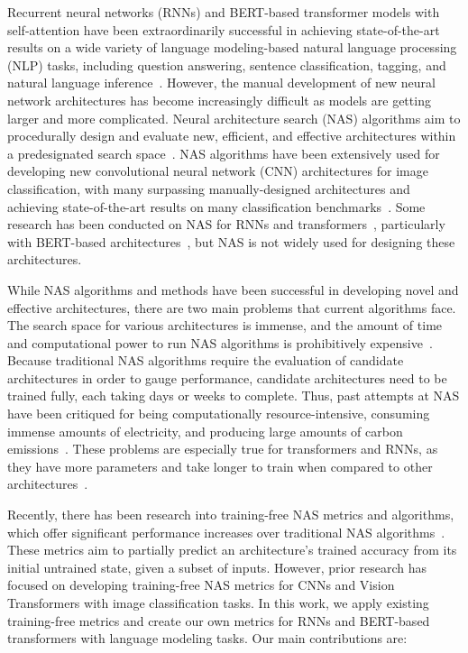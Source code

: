 \documentclass[11pt]{article}
\begin{document}
Recurrent neural networks (RNNs) and BERT-based transformer models with self-attention have been extraordinarily successful in achieving state-of-the-art results on a wide variety of language modeling-based natural language processing (NLP) tasks, including question answering, sentence classification, tagging, and natural language inference~\cite{brown_language_2020, palangi_deep_2016, raffel_exploring_2020, sundermeyer_lstm_2012, yu_review_2019}. However, the manual development of new neural network architectures has become increasingly difficult as models are getting larger and more complicated. Neural architecture search (NAS) algorithms aim to procedurally design and evaluate new, efficient, and effective architectures within a predesignated search space~\cite{zoph_neural_2017}. NAS algorithms have been extensively used for developing new convolutional neural network (CNN) architectures for image classification, with many surpassing manually-designed architectures and achieving state-of-the-art results on many classification benchmarks~\cite{tan_efficientnet_2019, real_regularized_2019}. Some research has been conducted on NAS for RNNs and transformers~\cite{so_evolved_2019, so_searching_2021, jing_nasabn_2020}, particularly with BERT-based architectures~\cite{yin_autotinybert_2021, xu_nas-bert_2021, gao_autobert-zero_2022, tuli_flexibert_2022, chitty-venkata_neural_2022}, but NAS is not widely used for designing these architectures.
    
    While NAS algorithms and methods have been successful in developing novel and effective architectures, there are two main problems that current algorithms face. The search space for various architectures is immense, and the amount of time and computational power to run NAS algorithms is prohibitively expensive~\cite{mehta_nas-bench-suite_2022}. Because traditional NAS algorithms require the evaluation of candidate architectures in order to gauge performance, candidate architectures need to be trained fully, each taking days or weeks to complete. Thus, past attempts at NAS have been critiqued for being computationally resource-intensive, consuming immense amounts of electricity, and producing large amounts of carbon emissions~\cite{strubell_energy_2019}. These problems are especially true for transformers and RNNs, as they have more parameters and take longer to train when compared to other architectures~\cite{so_evolved_2019, zhou_training-free_2022}.
    
    Recently, there has been research into training-free NAS metrics and algorithms, which offer significant performance increases over traditional NAS algorithms~\cite{abdelfattah_zero-cost_2020, mellor_neural_2021, zhou_training-free_2022}. These metrics aim to partially predict an architecture's trained accuracy from its initial untrained state, given a subset of inputs. However, prior research has focused on developing training-free NAS metrics for CNNs and Vision Transformers with image classification tasks. In this work, we apply existing training-free metrics and create our own metrics for RNNs and BERT-based transformers with language modeling tasks. Our main contributions are:
\end{document}
